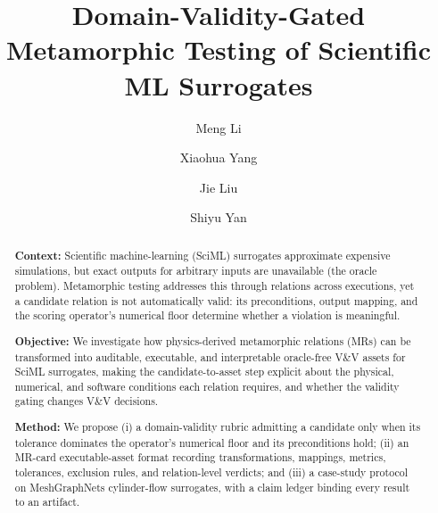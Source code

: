 \documentclass[preprint,12pt]{elsarticle}
\begin{document}
\begin{frontmatter}

\title{Domain-Validity-Gated Metamorphic Testing of Scientific ML Surrogates}

\author[inst1,inst2,inst3]{Meng Li}
\author[inst1,inst2,inst3]{Xiaohua Yang}
\author[inst1,inst2,inst3]{Jie Liu}
\author[inst1,inst2,inst3]{Shiyu Yan}

\begin{abstract}
\textbf{Context:}
Scientific machine-learning (SciML) surrogates approximate expensive simulations, but exact outputs for arbitrary inputs are unavailable (the oracle problem). Metamorphic testing addresses this through relations across executions, yet a candidate relation is not automatically valid: its preconditions, output mapping, and the scoring operator's numerical floor determine whether a violation is meaningful.

\textbf{Objective:}
We investigate how physics-derived metamorphic relations (MRs) can be transformed into auditable, executable, and interpretable oracle-free V\&V assets for SciML surrogates, making the candidate-to-asset step explicit about the physical, numerical, and software conditions each relation requires, and whether the validity gating changes V\&V decisions.

\textbf{Method:}
We propose (i) a domain-validity rubric admitting a candidate only when its tolerance dominates the operator's numerical floor and its preconditions hold; (ii) an MR-card executable-asset format recording transformations, mappings, metrics, tolerances, exclusion rules, and relation-level verdicts; and (iii) a case-study protocol on MeshGraphNets cylinder-flow surrogates, with a claim ledger binding every result to an artifact.


\end{abstract}
\end{frontmatter}
\end{document}
